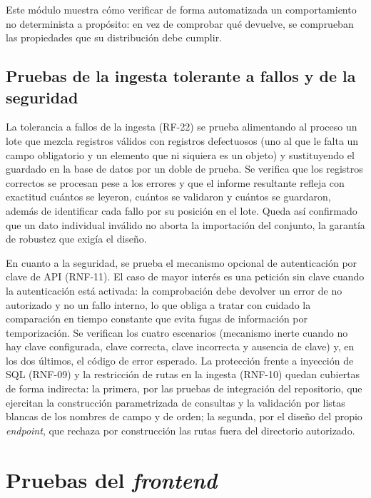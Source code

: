 Este módulo muestra cómo verificar de forma automatizada un comportamiento no
determinista a propósito: en vez de comprobar qué devuelve, se comprueban las
propiedades que su distribución debe cumplir.

\subsection{Pruebas de la ingesta tolerante a fallos y de la seguridad}
\label{sec:test-ingesta-seguridad}

La tolerancia a fallos de la ingesta (RF-22) se prueba alimentando al proceso un
lote que mezcla registros válidos con registros defectuosos (uno al que le falta
un campo obligatorio y un elemento que ni siquiera es un objeto) y sustituyendo
el guardado en la base de datos por un doble de prueba. Se verifica que los
registros correctos se procesan pese a los errores y que el informe resultante
refleja con exactitud cuántos se leyeron, cuántos se validaron y cuántos se
guardaron, además de identificar cada fallo por su posición en el lote. Queda así
confirmado que un dato individual inválido no aborta la importación del conjunto,
la garantía de robustez que exigía el diseño.

En cuanto a la seguridad, se prueba el mecanismo opcional de autenticación por
clave de API (RNF-11). El caso de mayor interés es una petición sin clave cuando
la autenticación está activada: la comprobación debe devolver un error de no
autorizado y no un fallo interno, lo que obliga a tratar con cuidado la
comparación en tiempo constante que evita fugas de información por temporización.
Se verifican los cuatro escenarios (mecanismo inerte cuando no hay clave
configurada, clave correcta, clave incorrecta y ausencia de clave) y, en los dos
últimos, el código de error esperado. La protección frente a inyección de SQL
(RNF-09) y la restricción de rutas en la ingesta (RNF-10) quedan cubiertas de
forma indirecta: la primera, por las pruebas de integración del repositorio, que
ejercitan la construcción parametrizada de consultas y la validación por listas
blancas de los nombres de campo y de orden; la segunda, por el diseño del propio
\emph{endpoint}, que rechaza por construcción las rutas fuera del directorio
autorizado.

\section{Pruebas del \emph{frontend}}
\label{sec:test-frontend}

